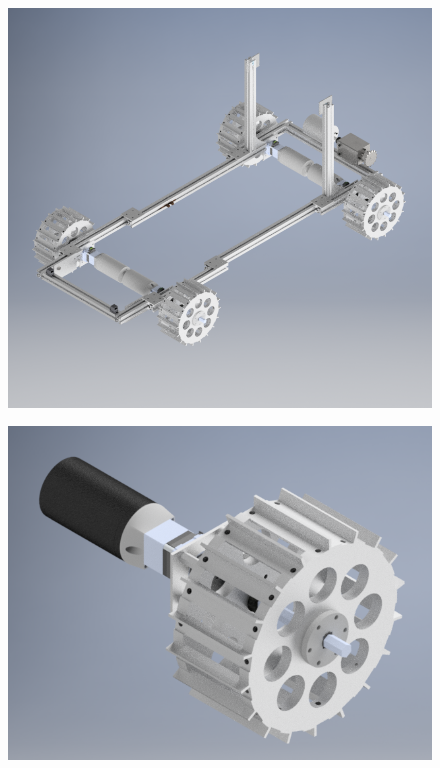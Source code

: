 \documentclass[class=article, crop=false]{standalone}
\begin{document}
	
	\begin{figure}
	\centering
	\begin{minipage}{.49\textwidth}
	  \centering
	  \includegraphics[width=.9\linewidth]{09_Figures/frame-cad.jpg}
	  \label{fig:frame-cad}
	\end{minipage}
	\begin{minipage}{.49\textwidth}
	  \centering
	  \includegraphics[width=.9\linewidth]{09_Figures/wheel-cad.jpg}
	  \label{fig:wheel-cad}
	\end{minipage}
	\end{figure}
	
\end{document}
